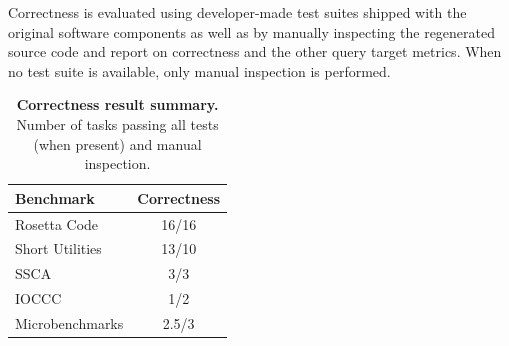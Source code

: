 \documentclass[nonacm,sigplan,review]{acmart}
\begin{document}
Correctness is evaluated using developer-made test suites 
shipped with the original software components as well as by manually inspecting
the regenerated source code and report on correctness and the other query target metrics.
When no test suite is available, only manual inspection is performed.

\begin{table}[htpb]
  \centering
  \caption{\textbf{Correctness result summary.} Number of tasks passing all tests (when present) and manual inspection.}
  \begin{tabular}{lc}
    \toprule
    Benchmark & Correctness \\ 
    \midrule
    Rosetta Code & 16/16  \\
    Short Utilities & 13/10 \\
    SSCA & 3/3  \\
    IOCCC & 1/2 \\
    Microbenchmarks & 2.5/3  \\
    \bottomrule
  \end{tabular}
\end{table}
\end{document}
